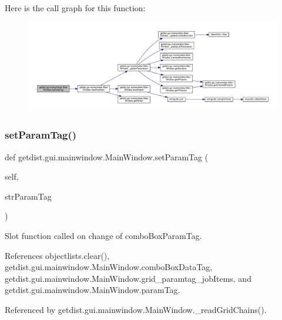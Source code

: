 Here is the call graph for this function\+:
\nopagebreak
\begin{figure}[H]
\begin{center}
\leavevmode
\includegraphics[width=350pt]{classgetdist_1_1gui_1_1mainwindow_1_1MainWindow_a8245458267a1ec89415f146dec08a2ef_cgraph}
\end{center}
\end{figure}
\mbox{\label{classgetdist_1_1gui_1_1mainwindow_1_1MainWindow_aceae6c103872070c2383fffa54ee75e9}} 
\subsubsection{\texorpdfstring{set\+Param\+Tag()}{setParamTag()}}
{\footnotesize\ttfamily def getdist.\+gui.\+mainwindow.\+Main\+Window.\+set\+Param\+Tag (\begin{DoxyParamCaption}\item[{}]{self,  }\item[{}]{str\+Param\+Tag }\end{DoxyParamCaption})}

\begin{DoxyVerb}Slot function called on change of comboBoxParamTag.
\end{DoxyVerb}
 

References objectlists.\+clear(), getdist.\+gui.\+mainwindow.\+Main\+Window.\+combo\+Box\+Data\+Tag, getdist.\+gui.\+mainwindow.\+Main\+Window.\+grid\+\_\+paramtag\+\_\+job\+Items, and getdist.\+gui.\+mainwindow.\+Main\+Window.\+param\+Tag.



Referenced by getdist.\+gui.\+mainwindow.\+Main\+Window.\+\_\+read\+Grid\+Chains().

